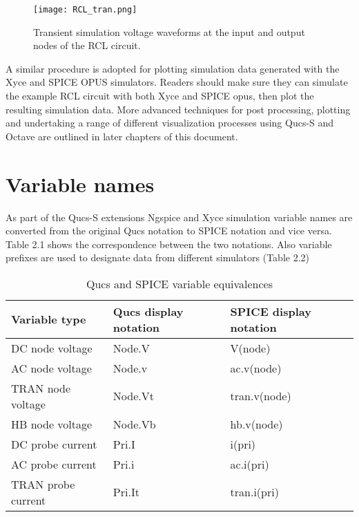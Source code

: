  \begin{figure}[h]
	\centering
	\texttt{[image: RCL\_tran.png]}
	\caption{ Transient simulation voltage waveforms at the input and output nodes of the RCL circuit.  }
	\label{Fig15}
\end{figure}
A similar procedure is adopted for plotting simulation data generated with the Xyce and SPICE OPUS simulators.  Readers should make sure they can simulate the example RCL circuit with both Xyce and SPICE opus, then plot the resulting simulation data.  More advanced techniques for post processing, plotting and undertaking a range of different visualization processes using Qucs-S and Octave are outlined in later chapters of this document.

\section{Variable names}
As part of the Qucs-S extensions Ngspice and Xyce simulation variable names are converted from the original Qucs
notation to SPICE notation and vice versa. Table 2.1 shows the correspondence between the two notations. Also variable prefixes are used to designate data from different simulators (Table 2.2)

\begin{table} [h]
	\centering
	\caption{Qucs and SPICE  variable equivalences}
	\label{Table1}
	\begin{tabular}  {|l|l|l|} \hline
		\textbf{Variable type}&\textbf{Qucs display notation}&  \textbf{SPICE display notation} \\
		\hline
		DC node voltage   &    Node.V    &       V(node) \\
		AC node voltage   &    Node.v    &       ac.v(node)\\
		TRAN node voltage &    Node.Vt   &       tran.v(node)\\
		HB node voltage   &    Node.Vb   &       hb.v(node) \\
		DC probe current  &    Pri.I     &       i(pri)  \\
		AC probe current  &    Pri.i     &       ac.i(pri)\\
		TRAN probe current &   Pri.It    &       tran.i(pri)\\
		\hline
	\end{tabular}
\end{table}

